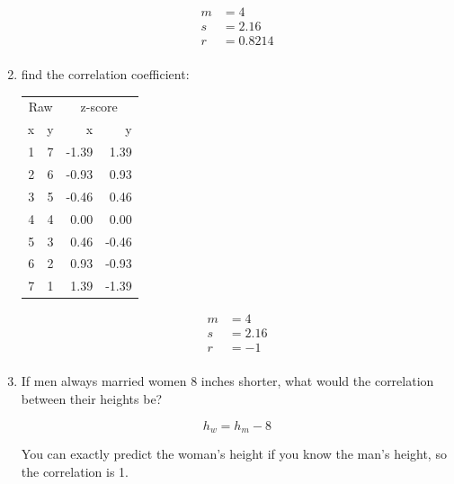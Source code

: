 \documentclass[landscape]{exam}
\begin{document}
\begin{enumerate}
    \begin{solution}
      \begin{align*}
        m &= 4 \\
        s &= 2.16 \\
        r &= 0.8214 \\
      \end{align*}
    \end{solution}

    \item find the correlation coefficient:
      \begin{table}[ht]
      \centering
      \begin{tabular}{rrrr}
        \toprule
        \multicolumn{2}{c}{Raw} & \multicolumn{2}{c}{z-score } \\
        \cmidrule(r){1-2} \cmidrule(r){3-4} 
        x & y & x     & y \\
        \midrule
        1 & 7 & -1.39 & 1.39 \\ 
        2 & 6 & -0.93 & 0.93 \\ 
        3 & 5 & -0.46 & 0.46 \\ 
        4 & 4 & 0.00 & 0.00 \\ 
        5 & 3 & 0.46 & -0.46 \\ 
        6 & 2 & 0.93 & -0.93 \\ 
        7 & 1 & 1.39 & -1.39 \\ 
        \bottomrule
      \end{tabular}
      \end{table}

    \begin{solution}
      \begin{align*}
        m &= 4 \\
        s &= 2.16 \\
        r &= -1 \\
      \end{align*}
    \end{solution}

    \item If men always married women 8 inches shorter, what would the
      correlation between their heights be?
      
      \begin{solution}
        \[
          h_w = h_m - 8
        \]

        You can exactly predict the woman's height if you know the man's
        height, so the correlation is 1.


\end{solution}
\end{enumerate}
\end{document}
